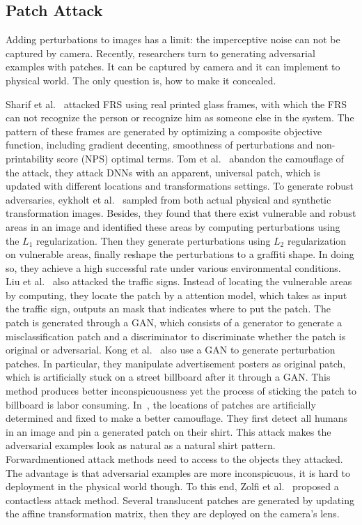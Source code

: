 \documentclass[10pt,twocolumn,letterpaper]{article}
\begin{document}
\subsection{Patch Attack}
Adding perturbations to images has a limit: 
the imperceptive noise can not be captured by camera.
Recently, researchers turn to generating adversarial examples with
patches. It can be captured by camera and it can implement to physical
world. The only question is, how to make it concealed.

Sharif et al.~\cite{Sharif_2017_CCS} attacked FRS using real 
printed glass frames, 
with which the FRS can not recognize the person or recognize him
as someone else in the system. The pattern of these frames are 
generated by optimizing a composite objective function, 
including gradient decenting, smoothness of perturbations and 
non-printability score (NPS) optimal terms.
Tom et al.~\cite{Brown_2017_arxiv} abandon the camouflage of the attack, 
they attack DNNs with an apparent, universal patch, 
which is updated with different locations and transformations settings.
To generate robust adversaries, 
eykholt et al.~\cite{Eykholt_2018_CVPR} sampled from both 
actual physical and synthetic transformation images. Besides,
they found that there exist vulnerable and robust areas in an 
image and identified these areas by computing perturbations 
using the $L_1$ regularization. Then they generate perturbations 
using $L_2$ regularization on vulnerable areas, finally reshape 
the perturbations to a graffiti shape. In doing so, they achieve 
a high successful rate under various environmental conditions.
Liu et al.~\cite{Liu_2019_AAAI} also attacked the traffic signs. 
Instead of 
locating the vulnerable areas by computing, they locate 
the patch by a attention model, which takes as input the 
traffic sign, outputs an mask that indicates where to put the patch. 
The patch is generated through a GAN, which consists of a generator 
to generate a misclassification patch and a discriminator 
to discriminate whether the patch is original or adversarial. 
Kong et al.~\cite{Kong_2020_CVPR} also use a GAN to generate 
perturbation patches. 
In particular, they manipulate advertisement posters as original patch, 
which is artificially stuck on a street billboard after it 
through a GAN. This method produces better inconspicuousness yet 
the process of sticking the patch to billboard is labor consuming.
In~\cite{Hu_2021_ICCV}, the locations of patches are artificially 
determined and fixed
to make a better camouflage.
They first detect all humans in an image and pin a generated patch 
on their shirt. This attack makes the adversarial examples look as 
natural as a natural shirt pattern.
Forwardmentioned attack methods need to access to the objects they 
attacked. The advantage is that adversarial examples are more 
inconspicuous, it is hard to deployment in the physical world though. 
To this end, Zolfi et al.~\cite{Zolfi_2021_CVPR} proposed 
a contactless attack method. 
Several translucent patches are generated by updating the affine 
transformation matrix, then they are deployed on the camera's lens.
\end{document}
